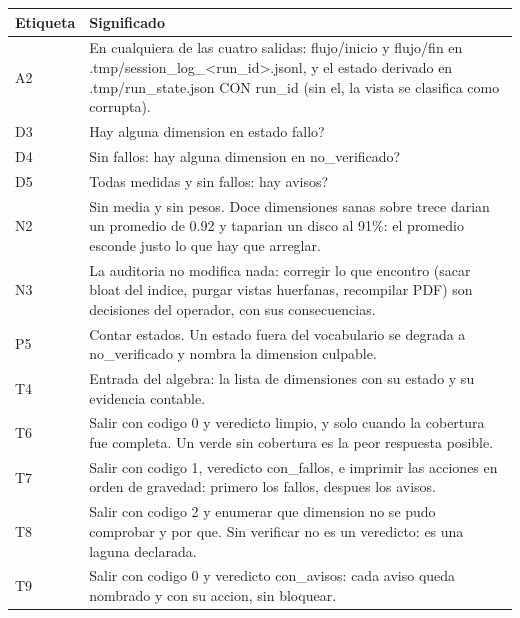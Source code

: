 \documentclass[11pt,a4paper]{article}
\begin{document}
\vspace{6pt}
\begin{tcolorbox}[cajaContenido, title={\faIcon{table}~Leyenda de etiquetas}]
\small
\begin{tabularx}{\linewidth}{@{}>{\centering\arraybackslash}p{1.4cm}X@{}}
\toprule
\textbf{Etiqueta} & \textbf{Significado} \\ \midrule
A2 & En cualquiera de las cuatro salidas: flujo/inicio y flujo/fin en .tmp/session\_log\_<run\_id>.jsonl, y el estado derivado en .tmp/run\_state.json CON run\_id (sin el, la vista se clasifica como corrupta). \\
D3 & Hay alguna dimension en estado fallo? \\
D4 & Sin fallos: hay alguna dimension en no\_verificado? \\
D5 & Todas medidas y sin fallos: hay avisos? \\
N2 & Sin media y sin pesos. Doce dimensiones sanas sobre trece darian un promedio de 0.92 y taparian un disco al 91\%: el promedio esconde justo lo que hay que arreglar. \\
N3 & La auditoria no modifica nada: corregir lo que encontro (sacar bloat del indice, purgar vistas huerfanas, recompilar PDF) son decisiones del operador, con sus consecuencias. \\
P5 & Contar estados. Un estado fuera del vocabulario se degrada a no\_verificado y nombra la dimension culpable. \\
T4 & Entrada del algebra: la lista de dimensiones con su estado y su evidencia contable. \\
T6 & Salir con codigo 0 y veredicto limpio, y solo cuando la cobertura fue completa. Un verde sin cobertura es la peor respuesta posible. \\
T7 & Salir con codigo 1, veredicto con\_fallos, e imprimir las acciones en orden de gravedad: primero los fallos, despues los avisos. \\
T8 & Salir con codigo 2 y enumerar que dimension no se pudo comprobar y por que. Sin verificar no es un veredicto: es una laguna declarada. \\
T9 & Salir con codigo 0 y veredicto con\_avisos: cada aviso queda nombrado y con su accion, sin bloquear. \\
\bottomrule
\end{tabularx}
\end{tcolorbox}
\end{document}
